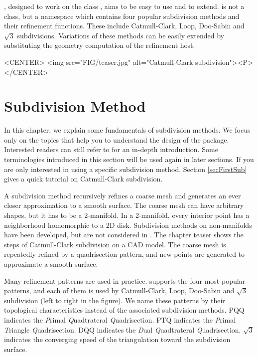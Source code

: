 , designed to work on the class 
, aims to be easy to use and to extend.
 is not a class, but a namespace 
which contains four popular subdivision methods and their refinement
functions. These include Catmull-Clark, Loop, Doo-Sabin and 
$\sqrt{3}$ subdivisions. Variations of these methods can be easily 
extended by substituting the geometry computation of the refinement
host.

\begin{ccHtmlOnly}
     <CENTER>
         <img src="FIG/teaser.jpg" alt="Catmull-Clark subdivision"><P>
     </CENTER>
\end{ccHtmlOnly}

\section{Subdivision Method}
\label{secSubAlgo}
In this chapter, we explain some fundamentals of 
subdivision methods. We focus only on the topics that help you 
to understand the design of the package. Interested readers can
still refer to \cite{cgal:ww-smgd-02} for an in-depth introduction.
Some terminologies introduced in this section will be used again
in later sections. If you are only interested in using a 
specific subdivision method, Section \ref{secFirstSub} 
gives a quick tutorial on Catmull-Clark subdivision.

A subdivision method recursively refines a coarse mesh and 
generates an ever closer approximation to a smooth surface.
The coarse mesh can have arbitrary shapes, but it has to 
be a 2-manifold. In a 2-manifold, every interior point has 
a neighborhood homomorphic to a 2D disk. Subdivision methods
on non-manifolds have been developed, but are not considered
in . 
The chapter teaser shows the steps of Catmull-Clark 
subdivision on a CAD model. The coarse mesh is repeatedly refined 
by a quadrisection pattern, and new points are generated 
to approximate a smooth surface.

Many refinement patterns are used in practice. 
 supports the four most popular 
patterns, and each of them is used by 
Catmull-Clark\cite{cgal:cc-rgbss-78}, Loop, Doo-Sabin 
and $\sqrt{3}$ subdivision (left to right in the 
figure). We name these patterns by their topological
characteristics instead of the associated subdivision methods. 
PQQ indicates the \emph{P}rimal \emph{Q}uadtrateral \emph{Q}uadrisection. 
PTQ indicates the \emph{P}rimal \emph{T}riangle \emph{Q}uadrisection. 
DQQ indicates the \emph{D}ual \emph{Q}uadtrateral \emph{Q}uadrisection.
$\sqrt{3}$ indicates the converging speed of the triangulation toward
the subdivision surface.

